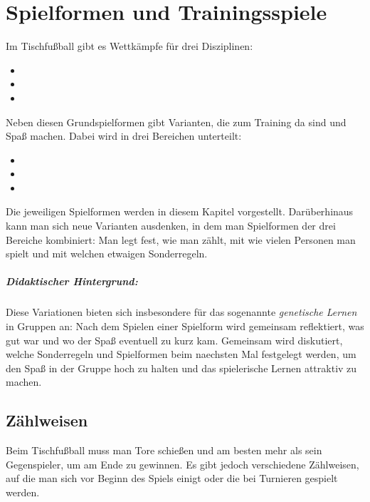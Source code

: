 \chapter{Spielformen und Trainingsspiele}
\label{spielformen}

Im Tischfußball gibt es Wettkämpfe für drei Disziplinen: 
\begin{itemize}
\item {}
\item {}
\item {}
\end{itemize}
Neben diesen Grundspielformen gibt Varianten, die zum Training da sind und Spaß machen. Dabei wird in drei Bereichen unterteilt:
\begin{itemize}
\item {}
\item {}
\item {}
\end{itemize}
Die jeweiligen Spielformen werden in diesem Kapitel vorgestellt. Darüberhinaus kann man sich neue Varianten ausdenken, in dem man Spielformen der drei Bereiche kombiniert: Man legt fest, wie man zählt, mit wie vielen Personen man spielt und mit welchen etwaigen Sonderregeln.

\paragraph{Didaktischer Hintergrund:} Diese Variationen bieten sich insbesondere für das sogenannte {\it  genetische Lernen} in Gruppen an: Nach dem Spielen einer Spielform wird gemeinsam reflektiert, was gut war und wo der Spaß eventuell zu kurz kam. Gemeinsam wird diskutiert, welche Sonderregeln und Spielformen beim naechsten Mal festgelegt werden, um den Spaß in der Gruppe hoch zu halten und das spielerische Lernen attraktiv zu machen. 

\section{Zählweisen}
\label{spielformen:zaehlweisen}

Beim Tischfußball muss man Tore schießen und am besten mehr als sein Gegenspieler, um am Ende zu gewinnen.
Es gibt jedoch verschiedene Zählweisen, auf die man sich vor Beginn des Spiels einigt oder die bei Turnieren gespielt werden. 

